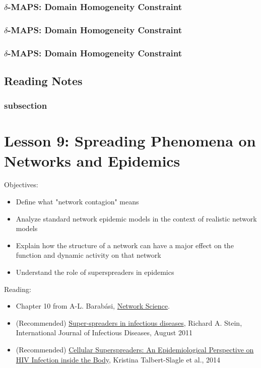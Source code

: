 \documentclass[11pt]{scrartcl} %
\begin{document}
\subsubsection{$\delta$-MAPS: Domain Homogeneity Constraint}
\subsubsection{$\delta$-MAPS: Domain Homogeneity Constraint}
\subsubsection{$\delta$-MAPS: Domain Homogeneity Constraint}
\subsubsection{}

\subsection{Reading Notes}

\subsubsection{subsection}
\textbf{}


\section{Lesson 9: Spreading Phenomena on Networks and Epidemics}

Objectives:
\begin{itemize}
	\item Define what "network contagion" means
	\item Analyze standard network epidemic models in the context of realistic network models 
	\item Explain how the structure of a network can have a major effect on the function and dynamic activity on that network 
	\item Understand the role of superspreaders in epidemics
\end{itemize}

Reading:
\begin{itemize}
	\item Chapter 10 from A-L. Barabási, \href{http://networksciencebook.com/}{Network Science}.
	\item (Recommended) \href{https://doi.org/10.1016/j.ijid.2010.06.020}{Super-spreaders in infectious diseases}, Richard A. Stein, International Journal of Infectious Diseases, August 2011
	\item (Recommended) \href{https://doi.org/10.1371/journal.ppat.1004092\%C2\%A0}{Cellular Superspreaders: An Epidemiological Perspective on HIV Infection inside the Body}, Kristina Talbert-Slagle et al., 2014
\end{itemize}
\end{document}
